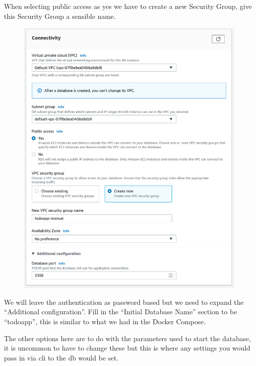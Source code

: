 \documentclass{csse4400}
\begin{document}
When selecting public access as yes we have to create a new Security Group,
give this Security Group a sensible name.

\begin{figure}[H]
  \includegraphics[width=\textwidth]{images/db6}
\end{figure}

We will leave the authentication as password based but we need to expand the ``Additional configuration''.
Fill in the ``Initial Database Name'' section to be ``todoapp'',
this is similar to what we had in the Docker Compose.

The other options here are to do with the parameters used to start the database, it is uncommon to have to change these but this is where
any settings you would pass in via cli to the db would be set.
\end{document}
